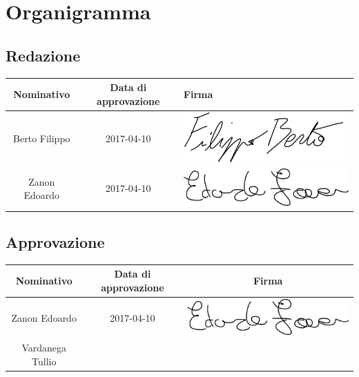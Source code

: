 \documentclass[../PianoDiProgetto_v3.0.0.tex]{subfiles}
\begin{document}
\section{Organigramma}
	\subsection{Redazione}
		\begin{table}[h]
		\begin{tabularx}{\textwidth}{C C X}
			\toprule
			\textbf{Nominativo} & \textbf{Data di approvazione} & \textbf{Firma} \\
			\midrule
			Berto Filippo & 2017-04-10 & \includegraphics[scale=0.3]{Firme/fberto_firma} \\[1ex]
			\midrule
			Zanon Edoardo & 2017-04-10 & \includegraphics[scale=0.4]{Firme/ezanon_firma} \\[1ex]
			\bottomrule
		\end{tabularx}
		
	\end{table}
	
	
	\subsection{Approvazione}
	
		\begin{table}[h]

		\begin{tabularx}{\textwidth}{C C C}
			\toprule
			\textbf{Nominativo} & \textbf{Data di approvazione} & \textbf{Firma} \\
			\midrule
			Zanon Edoardo & 2017-04-10 & \includegraphics[scale=0.3]{Firme/ezanon_firma} \\[1ex]
			\midrule
			Vardanega Tullio &  &  \\[1ex]
			\bottomrule
		\end{tabularx}
		
	\end{table}	
	
\end{document}
